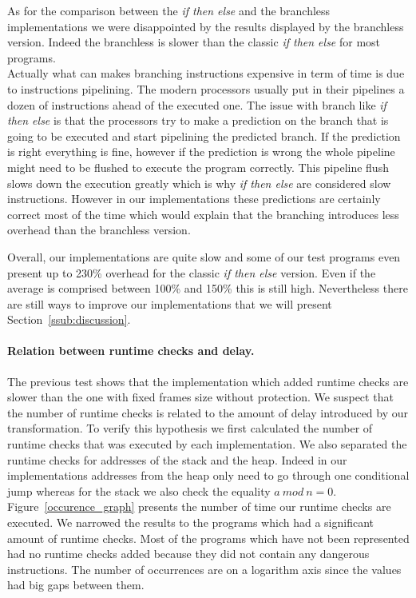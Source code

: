 \documentclass[11pt]{sdm}
\begin{document}
As for the comparison between the \textit{if then else} and the branchless implementations we were disappointed by the results displayed by the branchless version. Indeed the branchless is slower than the classic \textit{if then else} for most programs. \\
Actually what can makes branching instructions expensive in term of time is due to instructions pipelining. 
The modern processors usually put in their pipelines a dozen of instructions ahead of the executed one. 
The issue with branch like \textit{if then else} is that the processors try to make a prediction on the branch that is going to be executed and start pipelining the predicted branch.
If the prediction is right everything is fine, however if the prediction is wrong the whole pipeline might need to be flushed to execute the program correctly. This pipeline flush slows down the execution greatly which is why \textit{if then else} are considered slow instructions.
However in our implementations these predictions are certainly correct most of the time which would explain that the branching introduces less overhead than the branchless version.

Overall, our implementations are quite slow and some of our test programs even present up to 230\% overhead for the classic \textit{if then else} version. Even if the average is comprised between 100\% and 150\% this is still high. Nevertheless there are still ways to improve our implementations that we will present Section~\ref{ssub:discussion}.



\paragraph{Relation between runtime checks and delay.}
The previous test shows that the implementation which added runtime checks are slower than the one with fixed frames size without protection. We suspect that the number of runtime checks is related to the amount of delay introduced by our transformation. To verify this hypothesis we first calculated the number of runtime checks that was executed by each implementation.
We also separated the runtime checks for addresses of the stack and the heap. Indeed in our implementations addresses from the heap only need to go through one conditional jump whereas for the stack we also check the equality $a~mod~n=0$.
Figure~\ref{occurence_graph} presents the number of time our runtime checks are executed. We narrowed the results to the programs which had a significant amount of runtime checks. 
Most of the programs which have not been represented had no runtime checks added because they did not contain any dangerous instructions.
The number of occurrences are on a logarithm axis since the values had big gaps between them.
\end{document}
